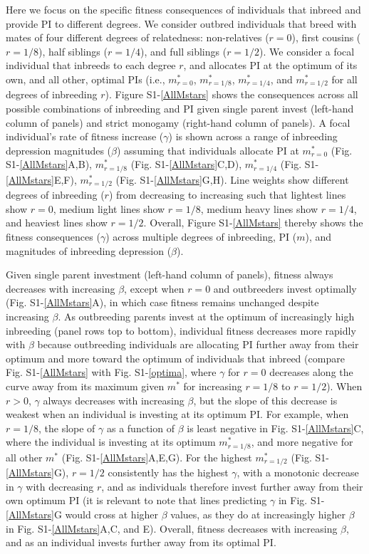 \documentclass[12pt]{article}
\begin{document}
Here we focus on the specific fitness consequences of individuals that inbreed and provide PI to different degrees. We consider outbred individuals that breed with mates of four different degrees of relatedness: non-relatives ($r=0$), first cousins ($r=1/8$), half siblings ($r=1/4$), and full siblings ($r=1/2$). We consider a focal individual that inbreeds to each degree $r$, and allocates PI at the optimum of its own, and all other, optimal PIs (i.e., $m^{*}_{r=0}$, $m^{*}_{r=1/8}$, $m^{*}_{r=1/4}$, and $m^{*}_{r=1/2}$ for all degrees of inbreeding $r$). Figure S1-\ref{AllMstars} shows the consequences across all possible combinations of inbreeding and PI given single parent invest (left-hand column of panels) and strict monogamy (right-hand column of panels). A focal individual's rate of fitness increase ($\gamma$) is shown across a range of inbreeding depression magnitudes ($\beta$) assuming that individuals allocate PI at $m^{*}_{r=0}$ (Fig. S1-\ref{AllMstars}A,B), $m^{*}_{r=1/8}$ (Fig. S1-\ref{AllMstars}C,D), $m^{*}_{r=1/4}$ (Fig. S1-\ref{AllMstars}E,F), $m^{*}_{r=1/2}$ (Fig. S1-\ref{AllMstars}G,H). Line weights show different degrees of inbreeding ($r$) from decreasing to increasing such that lightest lines show $r=0$, medium light lines show $r=1/8$, medium heavy lines show $r=1/4$, and heaviest lines show $r=1/2$. Overall, Figure S1-\ref{AllMstars} thereby shows the fitness consequences ($\gamma$) across multiple degrees of inbreeding, PI ($m$), and magnitudes of inbreeding depression ($\beta$).

Given single parent investment (left-hand column of panels), fitness always decreases with increasing $\beta$, except when $r=0$ and outbreeders invest optimally (Fig. S1-\ref{AllMstars}A), in which case fitness remains unchanged despite increasing $\beta$. As outbreeding parents invest at the optimum of increasingly high inbreeding (panel rows top to bottom), individual fitness decreases more rapidly with $\beta$ because outbreeding individuals are allocating PI further away from their optimum and more toward the optimum of individuals that inbreed (compare Fig. S1-\ref{AllMstars} with Fig. S1-\ref{optima}, where $\gamma$ for $r=0$ decreases along the curve away from its maximum given $m^{*}$ for increasing $r=1/8$ to $r=1/2$). When $r>0$, $\gamma$ always decreases with increasing $\beta$, but the slope of this decrease is weakest when an individual is investing at its optimum PI. For example, when $r=1/8$, the slope of $\gamma$ as a function of $\beta$ is least negative in Fig. S1-\ref{AllMstars}C, where the individual is investing at its optimum $m^{*}_{r=1/8}$, and more negative for all other $m^{*}$ (Fig. S1-\ref{AllMstars}A,E,G). For the highest $m^{*}_{r=1/2}$ (Fig. S1-\ref{AllMstars}G), $r=1/2$ consistently has the highest $\gamma$, with a monotonic decrease in $\gamma$ with decreasing $r$, and as individuals therefore invest further away from their own optimum PI (it is relevant to note that lines predicting $\gamma$ in Fig. S1-\ref{AllMstars}G would cross at higher $\beta$ values, as they do at increasingly higher $\beta$ in Fig. S1-\ref{AllMstars}A,C, and E). Overall, fitness decreases with increasing $\beta$, and as an individual invests further away from its optimal PI.
\end{document}
